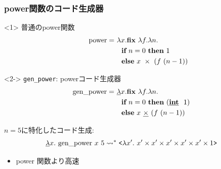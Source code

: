 \begin{frame}
  \frametitle{power関数のコード生成器}
  \begin{onlyenv}<1>
    普通のpower関数
    \begin{align*}
      \text{~~~~~~power} =~ &\lambda x. \textbf{fix}~ \lambda f. \lambda n. \\
                            &~~\textbf{if}~ n=0~ \textbf{then}~  1 \\
                            &~~\textbf{else}~ x~ \times~ (f~ (n - 1))
    \end{align*}
  \end{onlyenv}

  \begin{onlyenv}<2->
    \texttt{gen\_power}: powerコード生成器
    \begin{align*}
      \text{gen\_power} =~ &\underline{\lambda} x. \textbf{fix}~ \lambda f. \lambda n. \\
                           &~~\textbf{if}~ n=0~ \textbf{then}~ (\underline{\textbf{int}}~~ 1) \\
                           &~~\textbf{else}~ x~ \underline{\textbf{$\times$}}~ (f~ (n - 1))
    \end{align*}
  \end{onlyenv}

  \pause
  \pause
  $n = 5$に特化したコード生成:
  \pause
  \begin{align*}
    \underline{\lambda}{x}.{~\text{gen\_power}~ x~ 5} \leadsto^* \texttt{<}{\lambda{x'}.{~x'
    \times x' \times x' \times x' \times x' \times 1}}\texttt{>}
  \end{align*}

  \center
  \begin{itemize}
  \item power 関数より高速
  \end{itemize}

\end{frame}




